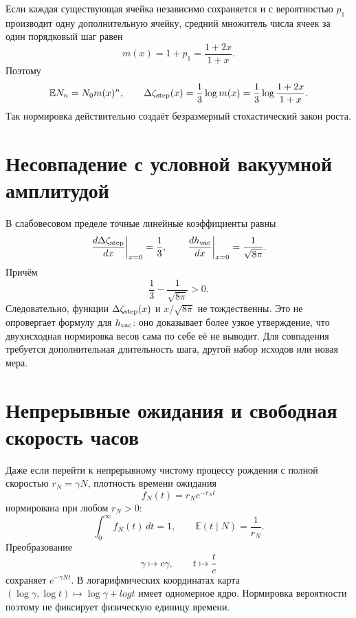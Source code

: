 Если каждая существующая ячейка независимо сохраняется и с вероятностью
$p_1$ производит одну дополнительную ячейку, средний множитель числа ячеек
за один порядковый шаг равен
\begin{equation}
 m(x)=1+p_1=\frac{1+2x}{1+x}.
 \label{eq:v10-birth-mean-multiplier}
\end{equation}
Поэтому
\begin{equation}
 \mathbb E N_n=N_0m(x)^n,
 \qquad
 \Delta\zeta_{\rm step}(x)
 =\frac13\log m(x)
 =\frac13\log\frac{1+2x}{1+x}.
 \label{eq:v10-birth-dimensionless-growth}
\end{equation}
Так нормировка действительно создаёт безразмерный стохастический закон
роста.

\section{Несовпадение с условной вакуумной амплитудой}

В слабовесовом пределе точные линейные коэффициенты равны
\begin{equation}
 \left.\frac{d\Delta\zeta_{\rm step}}{dx}\right|_{x=0}
 =\frac13,
 \qquad
 \left.\frac{dh_{\rm vac}}{dx}\right|_{x=0}
 =\frac1{\sqrt{8\pi}}.
 \label{eq:v10-birth-slope-comparison}
\end{equation}
Причём
\begin{equation}
 \frac13-\frac1{\sqrt{8\pi}}>0.
 \label{eq:v10-birth-prefactor-mismatch}
\end{equation}
Следовательно, функции
$\Delta\zeta_{\rm step}(x)$ и $x/\sqrt{8\pi}$ не тождественны. Это не
опровергает формулу для $h_{\rm vac}$: оно доказывает более узкое
утверждение, что двухисходная нормировка весов сама по себе её не выводит.
Для совпадения требуется дополнительная длительность шага, другой набор
исходов или новая мера.

\section{Непрерывные ожидания и свободная скорость часов}

Даже если перейти к непрерывному чистому процессу рождения с полной
скоростью $r_N=\gamma N$, плотность времени ожидания
\begin{equation}
 f_N(t)=r_Ne^{-r_Nt}
 \label{eq:v10-birth-waiting-density}
\end{equation}
нормирована при любом $r_N>0$:
\begin{equation}
 \int_0^\infty f_N(t)\,dt=1,
 \qquad
 \mathbb E(t\mid N)=\frac1{r_N}.
 \label{eq:v10-birth-waiting-normalization}
\end{equation}
Преобразование
\begin{equation}
 \gamma\longmapsto c\gamma,
 \qquad
 t\longmapsto\frac{t}{c}
 \label{eq:v10-birth-clock-rescaling}
\end{equation}
сохраняет $e^{-\gamma Nt}$. В логарифмических координатах карта
$(\log\gamma,\log t)\mapsto\log\gamma+log t$ имеет одномерное ядро.
Нормировка вероятности поэтому не фиксирует физическую единицу времени.

